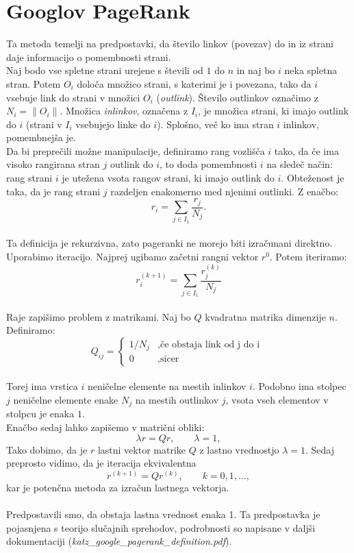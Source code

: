 \documentclass[a4paper]{article}
\begin{document}
\section{Googlov PageRank}
\hspace{4.8mm}Ta metoda temelji na predpostavki, da število linkov (povezav)  do in iz strani daje informacijo o pomembnosti strani. \\
Naj bodo vse spletne strani urejene s števili od $1$ do $n$ in naj bo $i$ neka spletna stran. Potem $O_i$ določa množico strani, s katerimi je i povezana, tako da $i$ vsebuje link do strani v množici $O_i$ (\textit{outlink}). Število outlinkov označimo z $N_i = \|O_i\|$. Množica \textit{inlinkov}, označena z $I_i$, je množica strani, ki imajo outlink do $i$ (strani v $I_i$ vsebujejo linke do $i$).
Splošno, več ko ima stran $i$ inlinkov, pomembnejša je. \\  Da bi preprečili možne manipulacije, definiramo rang vozlišča $i$ tako, da če ima visoko rangirana stran $j$ outlink do $i$, to doda pomembnosti $i$ na sledeč način: rang strani $i$ je utežena vsota rangov strani, ki imajo outlink do $i$. Obteženost  je taka, da je rang strani $j$ razdeljen enakomerno med njenimi outlinki. Z enačbo: $$r_i = \sum_{j \in I_1} \frac{r_j}{N_j}.$$ \\
Ta definicija je rekurzivna, zato pageranki ne morejo biti izračunani direktno. Uporabimo iteracijo. Najprej ugibamo začetni rangni vektor $r^0$. Potem iteriramo:
$$r_i^{(k+1)} = \sum_{j \in I_1} \frac{r_j^{(k)}}{N_j}$$ \\
Raje zapišimo problem z matrikami. Naj bo $Q$ kvadratna matrika dimenzije $n$. Definiramo:
\[
Q_{ij} = 
\left \{
	\begin{array}{ll}
		1/N_j  &, \mbox{če obstaja link od j do i }  \\
		0 &, \mbox{sicer} 
	\end{array}
\right. \]
\\
Torej ima vrstica $i$ neničelne elemente na mestih inlinkov $i$. Podobno ima stolpec $j$ neničelne elemente enake $N_j$ na mestih  outlinkov $j$, vsota vseh elementov v stolpcu je enaka $1$. \\
Enačbo sedaj lahko zapišemo v matrični obliki:
$$ \lambda r = Qr,     \qquad \lambda = 1,$$
Tako dobimo, da je $r$ lastni vektor matrike $Q$ z lastno vrednostjo $\lambda = 1$. Sedaj preprosto vidimo, da je iteracija ekvivalentna
$$r^{(k+1)} = Qr^{(k)},\qquad  k=0,1,… ,$$
kar je potenčna metoda za izračun lastnega vektorja.\\
\\ Predpostavili smo, da obstaja lastna vrednost enaka 1. Ta predpostavka je pojasnjena s teorijo slučajnih sprehodov, podrobnosti so napisane v daljši dokumentaciji (\textit{katz\_google\_pagerank\_definition.pdf}). \\
\end{document}
